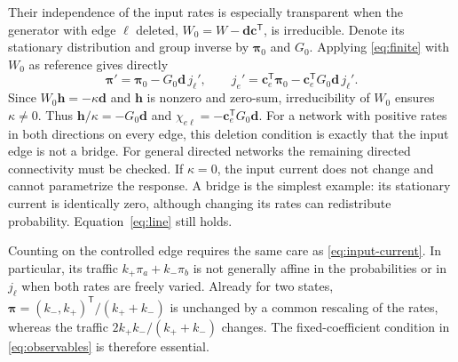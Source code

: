 \documentclass[
  reprint,
  superscriptaddress,
  amsmath,
  amssymb,
  aps,
  pre,
  longbibliography
]{revtex4-2}
\begin{document}
Their independence of the input rates is especially transparent when
the generator with edge $\ell$ deleted,
$W_0=W-\bm d\bm c^{\mathsf T}$, is irreducible. Denote its
stationary distribution and group inverse by $\bm\pi_0$ and $G_0$.
Applying \cref{eq:finite} with $W_0$ as reference gives directly
\begin{equation}
 \bm\pi'=\bm\pi_0-G_0\bm d\,j_\ell',\qquad
 j_e'=\bm c_e^{\mathsf T}\bm\pi_0
       -\bm c_e^{\mathsf T}G_0\bm d\,j_\ell'.
 \label{eq:deleted}
\end{equation}
Since $W_0\bm h=-\kappa\bm d$ and $\bm h$ is nonzero and zero-sum,
irreducibility of $W_0$ ensures $\kappa\ne0$. Thus
$\bm h/\kappa=-G_0\bm d$ and
$\chi_{e\ell}=-\bm c_e^{\mathsf T}G_0\bm d$.
For a network with positive rates in both directions on every edge,
this deletion condition is exactly that the input edge is not a bridge.
For general directed networks the remaining directed connectivity must
be checked. If $\kappa=0$, the input current does not change and
cannot parametrize the response. A bridge is the simplest example:
its stationary current is identically zero, although changing its rates
can redistribute probability. Equation~\eqref{eq:line} still holds.

Counting on the controlled edge requires the same care as
\cref{eq:input-current}. In particular, its traffic
$k_+\pi_a+k_-\pi_b$ is not generally affine in the probabilities
or in $j_\ell$ when both rates are freely varied. Already for two states,
$\bm\pi=(k_-,k_+)^{\mathsf T}/(k_++k_-)$ is unchanged by a
common rescaling of the rates, whereas the traffic
$2k_+k_-/(k_++k_-)$ changes. The fixed-coefficient condition in
\cref{eq:observables} is therefore essential.
\end{document}
